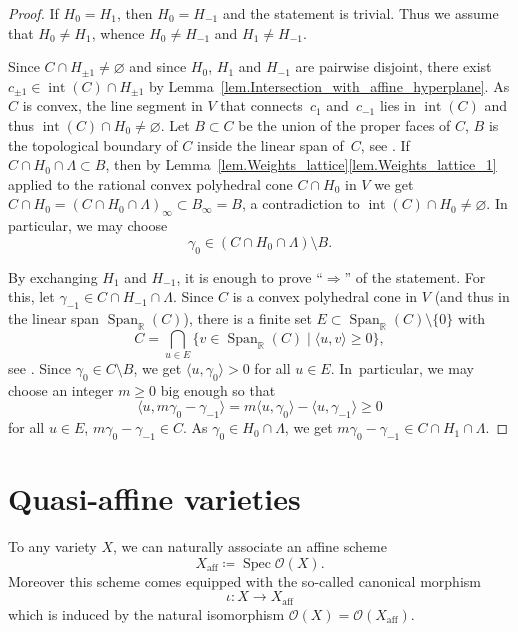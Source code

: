 \documentclass[JEP,XML,SOM,Unicode]{cedram}
\let\mathcal\mathscr
\theoremstyle{plain}
\theoremstyle{definition}
\DeclareMathOperator{\Spec}{Spec}
\DeclareMathOperator{\aff}{aff}
\DeclareMathOperator{\Span}{Span}
\DeclareMathOperator{\inter}{int}
\newcommand{\OO}{\mathcal{O}}
\newcommand{\RR}{\mathbb{R}}
\newcommand{\set}[2]{\{#1 \mid #2\}}
\newcommand{\sprod}[2]{\langle #1, #2 \rangle}
\begin{document}
\begin{proof}
If $H_0 = H_1$, then $H_0 = H_{-1}$ and the statement is trivial. Thus we assume that $H_0 \neq H_1$,
whence $H_0 \neq H_{-1}$ and $H_{1} \neq H_{-1}$.

Since $C \cap H_{\pm 1} \neq \varnothing$ and since $H_0$, $H_1$ and $H_{-1}$ are pairwise disjoint,
there exist $c_{\pm 1} \in \inter(C) \cap H_{\pm 1}$ by Lemma~\ref{lem.Intersection_with_affine_hyperplane}. As $C$ is convex, the line segment in
$V$ that connects~$c_1$ and~$c_{-1}$ lies in $\inter(C)$ and thus
$\inter(C) \cap H_0 \neq \varnothing$. Let
$B \subset C$ be the union of the proper faces of $C$, \ie $B$ is the topological
boundary of $C$ inside the linear span of~$C$, see \cite[Propty\,(7), p.\,10]{Fu1993Introduction-to-to}.
If $C \cap H_0 \cap \Lambda \subset B$, then by Lemma~\ref{lem.Weights_lattice}\eqref{lem.Weights_lattice_1} applied to
the rational convex polyhedral cone
$C \cap H_0$ in $V$ we get $C \cap H_0 = (C \cap H_0 \cap \Lambda)_{\infty} \subset B_{\infty} = B$,
a contradiction to $\inter(C) \cap H_0 \neq \varnothing$.
In particular, we may choose
\[
\gamma_0 \in (C \cap H_0 \cap \Lambda) \setminus B.
\]

By exchanging $H_1$ and $H_{-1}$, it is enough to prove
``$\Rightarrow$'' of the statement.
For this, let $\gamma_{-1} \in C \cap H_{-1} \cap \Lambda$.
Since $C$ is a convex polyhedral cone in $V$ (and thus in the linear span $\Span_{\RR}(C)$),
there is a finite set $E \subset \Span_{\RR}(C) \setminus \{0\}$ with
\[
C = \bigcap_{u \in E} \set{v \in \Span_{\RR}(C)}{\sprod{u}{v}\geq 0},
\]
see \cite[Propty\,(8), p. 11]{Fu1993Introduction-to-to}.
Since $\gamma_0 \in C \setminus B$, we get $\sprod{u}{\gamma_0} > 0$ for all $u \in E$. In~particular, we
may choose an integer $m \geq 0$ big enough so that
\[
\sprod{u}{m \gamma_0 - \gamma_{-1}} = m \sprod{u}{\gamma_0} - \sprod{u}{\gamma_{-1}} \geq 0
\]
for all $u \in E$, \ie $m \gamma_0 - \gamma_{-1} \in C$.
As $\gamma_0 \in H_0 \cap \Lambda$, we get
$m \gamma_0 - \gamma_{-1} \in C \cap H_1 \cap \Lambda$.
\end{proof}

\section{Quasi-affine varieties}
\label{sec.Quasi-affine}

To any variety $X$, we can naturally associate an affine scheme
\[
X_{\aff} \coloneqq \Spec \OO(X).
\]
Moreover this scheme comes equipped with the so-called canonical morphism
\[
\iota \colon X \to X_{\aff}
\]
which is induced by the natural isomorphism $\OO(X) = \OO(X_{\aff})$.
\end{document}

